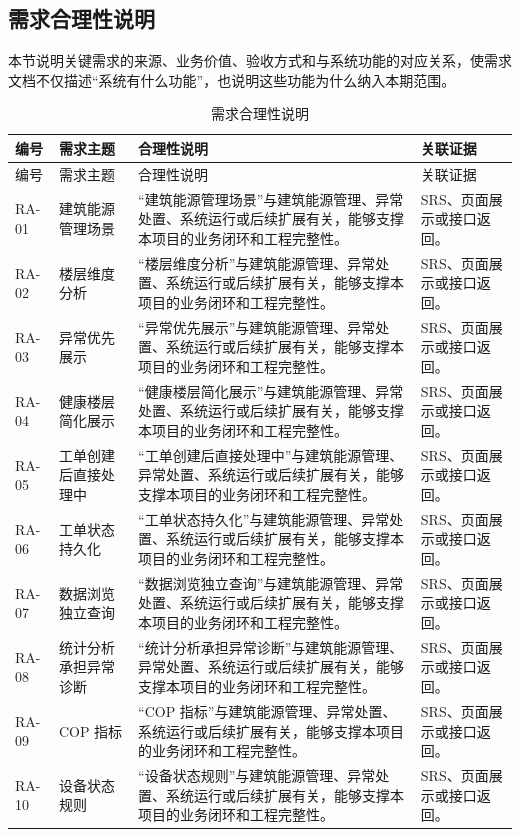 \documentclass[12pt,a4paper]{ctexart}
\begin{document}
\subsection{需求合理性说明}
本节说明关键需求的来源、业务价值、验收方式和与系统功能的对应关系，使需求文档不仅描述“系统有什么功能”，也说明这些功能为什么纳入本期范围。
\begin{longtable}{L{1.7cm}L{4.4cm}L{6.0cm}L{3.4cm}}
\caption{需求合理性说明}\\
\toprule
编号 & 需求主题 & 合理性说明 & 关联证据 \\
\midrule
\endfirsthead
\toprule
编号 & 需求主题 & 合理性说明 & 关联证据 \\
\midrule
\endhead
RA-01 & 建筑能源管理场景 & “建筑能源管理场景”与建筑能源管理、异常处置、系统运行或后续扩展有关，能够支撑本项目的业务闭环和工程完整性。 & SRS、页面展示或接口返回。 \\
RA-02 & 楼层维度分析 & “楼层维度分析”与建筑能源管理、异常处置、系统运行或后续扩展有关，能够支撑本项目的业务闭环和工程完整性。 & SRS、页面展示或接口返回。 \\
RA-03 & 异常优先展示 & “异常优先展示”与建筑能源管理、异常处置、系统运行或后续扩展有关，能够支撑本项目的业务闭环和工程完整性。 & SRS、页面展示或接口返回。 \\
RA-04 & 健康楼层简化展示 & “健康楼层简化展示”与建筑能源管理、异常处置、系统运行或后续扩展有关，能够支撑本项目的业务闭环和工程完整性。 & SRS、页面展示或接口返回。 \\
RA-05 & 工单创建后直接处理中 & “工单创建后直接处理中”与建筑能源管理、异常处置、系统运行或后续扩展有关，能够支撑本项目的业务闭环和工程完整性。 & SRS、页面展示或接口返回。 \\
RA-06 & 工单状态持久化 & “工单状态持久化”与建筑能源管理、异常处置、系统运行或后续扩展有关，能够支撑本项目的业务闭环和工程完整性。 & SRS、页面展示或接口返回。 \\
RA-07 & 数据浏览独立查询 & “数据浏览独立查询”与建筑能源管理、异常处置、系统运行或后续扩展有关，能够支撑本项目的业务闭环和工程完整性。 & SRS、页面展示或接口返回。 \\
RA-08 & 统计分析承担异常诊断 & “统计分析承担异常诊断”与建筑能源管理、异常处置、系统运行或后续扩展有关，能够支撑本项目的业务闭环和工程完整性。 & SRS、页面展示或接口返回。 \\
RA-09 & COP 指标 & “COP 指标”与建筑能源管理、异常处置、系统运行或后续扩展有关，能够支撑本项目的业务闭环和工程完整性。 & SRS、页面展示或接口返回。 \\
RA-10 & 设备状态规则 & “设备状态规则”与建筑能源管理、异常处置、系统运行或后续扩展有关，能够支撑本项目的业务闭环和工程完整性。 & SRS、页面展示或接口返回。 \\

\end{longtable}
\end{document}
